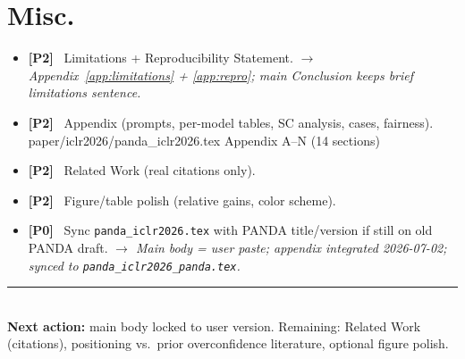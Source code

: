 \documentclass[11pt]{article}
\newcommand{\todo}{\item[$\square$]}
\newcommand{\done}{\item[\textcolor{donecolor}{$\boxtimes$}]}
\newcommand{\tagp}[2]{\textbf{\textcolor{#1}{[#2]}}\ }
\newcommand{\fixnote}[1]{\newline\textcolor{p2}{\itshape $\rightarrow$ #1}}
\newcommand{\datapath}[1]{\newline\textcolor{donecolor}{\small\ttfamily #1}}
\begin{document}
\section{Misc.}
\begin{itemize}
  \done \tagp{p2}{P2} Limitations + Reproducibility Statement.
        \fixnote{Appendix~\ref{app:limitations} + \ref{app:repro}; main Conclusion keeps brief limitations sentence.}

  \done \tagp{p2}{P2} Appendix (prompts, per-model tables, SC analysis, cases, fairness).
        \datapath{paper/iclr2026/panda\_iclr2026.tex Appendix A--N (14 sections)}

  \todo \tagp{p2}{P2} Related Work (real citations only).

  \todo \tagp{p2}{P2} Figure/table polish (relative gains, color scheme).

  \done \tagp{p0}{P0} Sync \texttt{panda\_iclr2026.tex} with PANDA title/version if still on old PANDA draft.
        \fixnote{Main body = user paste; appendix integrated 2026-07-02; synced to \texttt{panda\_iclr2026\_panda.tex}.}
\end{itemize}

\bigskip
\noindent\rule{\linewidth}{0.4pt}\\[2pt]
\small\textbf{Next action:} main body locked to user version. Remaining: Related Work (citations), positioning vs.\ prior overconfidence literature, optional figure polish.
\end{document}
